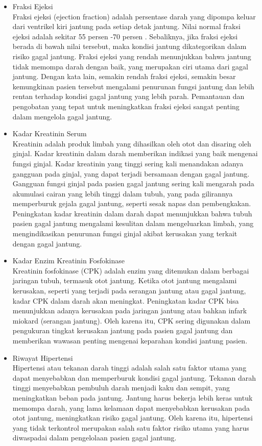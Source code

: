 \documentclass[english,12pt,a4paper,openany]{book}
\begin{document}
\begin{enumerate}
\begin{itemize}
			\item Fraksi Ejeksi \\
			Fraksi ejeksi (ejection fraction) adalah persentase darah yang dipompa keluar dari ventrikel kiri jantung pada setiap detak jantung. Nilai normal fraksi ejeksi adalah sekitar 55 persen -70 persen . Sebaliknya, jika fraksi ejeksi berada di bawah nilai tersebut, maka kondisi jantung dikategorikan dalam risiko gagal jantung. Fraksi ejeksi yang rendah menunjukkan bahwa jantung tidak memompa darah dengan baik, yang merupakan ciri utama dari gagal jantung. Dengan kata lain, semakin rendah fraksi ejeksi, semakin besar kemungkinan pasien tersebut mengalami penurunan fungsi jantung dan lebih rentan terhadap kondisi gagal jantung yang lebih parah. Pemantauan dan pengobatan yang tepat untuk meningkatkan fraksi ejeksi sangat penting dalam mengelola gagal jantung.
			
			\item Kadar Kreatinin Serum \\
			Kreatinin adalah produk limbah yang dihasilkan oleh otot dan disaring oleh ginjal. Kadar kreatinin dalam darah memberikan indikasi yang baik mengenai fungsi ginjal. Kadar kreatinin yang tinggi sering kali menandakan adanya gangguan pada ginjal, yang dapat terjadi bersamaan dengan gagal jantung. Gangguan fungsi ginjal pada pasien gagal jantung sering kali mengarah pada akumulasi cairan yang lebih tinggi dalam tubuh, yang pada gilirannya memperburuk gejala gagal jantung, seperti sesak napas dan pembengkakan. Peningkatan kadar kreatinin dalam darah dapat menunjukkan bahwa tubuh pasien gagal jantung mengalami kesulitan dalam mengeluarkan limbah, yang mengindikasikan penurunan fungsi ginjal akibat kerusakan yang terkait dengan gagal jantung.
			
			\item Kadar Enzim Kreatinin Fosfokinase\\
			Kreatinin fosfokinase (CPK) adalah enzim yang ditemukan dalam berbagai jaringan tubuh, termasuk otot jantung. Ketika otot jantung mengalami kerusakan, seperti yang terjadi pada serangan jantung atau gagal jantung, kadar CPK dalam darah akan meningkat. Peningkatan kadar CPK bisa menunjukkan adanya kerusakan pada jaringan jantung atau bahkan infark miokard (serangan jantung). Oleh karena itu, CPK sering digunakan dalam pengukuran tingkat kerusakan jantung pada pasien gagal jantung dan memberikan wawasan penting mengenai keparahan kondisi jantung pasien.
			
			\item Riwayat Hipertensi\\
			Hipertensi atau tekanan darah tinggi adalah salah satu faktor utama yang dapat menyebabkan dan memperburuk kondisi gagal jantung. Tekanan darah tinggi menyebabkan pembuluh darah menjadi kaku dan sempit, yang meningkatkan beban pada jantung. Jantung harus bekerja lebih keras untuk memompa darah, yang lama kelamaan dapat menyebabkan kerusakan pada otot jantung, meningkatkan risiko gagal jantung. Oleh karena itu, hipertensi yang tidak terkontrol merupakan salah satu faktor risiko utama yang harus diwaspadai dalam pengelolaan pasien gagal jantung.
			

\end{itemize}
\end{enumerate}
\end{document}
